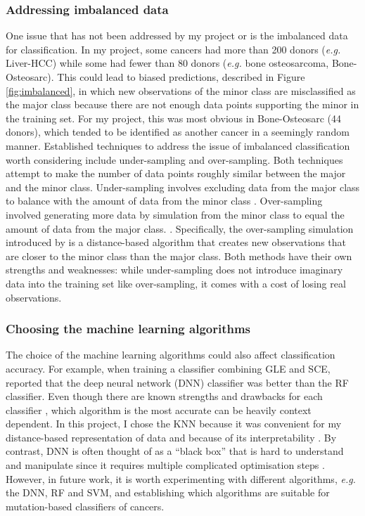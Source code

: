\subsubsection{Addressing imbalanced data}
One issue that has not been addressed by my project or \citet{Jiao2020} is the imbalanced data for classification. In my project, some cancers had more than 200 donors (\textit{e.g.} Liver-HCC) while some had fewer than 80 donors (\textit{e.g.} bone osteosarcoma, Bone-Osteosarc). This could lead to biased predictions, described in Figure \ref{fig:imbalanced}, in which new observations of the minor class are misclassified as the major class because there are not enough data points supporting the minor in the training set. For my project, this was most obvious in Bone-Osteosarc (44 donors), which tended to be identified as another cancer in a seemingly random manner. Established techniques to address the issue of imbalanced classification worth considering include under-sampling and over-sampling. Both techniques attempt to make the number of data points roughly similar between the major and the minor class. Under-sampling involves excluding data from the major class to balance with the amount of data from the minor class \citep{Kubat1997AddressingSelection}. Over-sampling involved generating more data by simulation from the minor class to equal the amount of data from the major class. \citep{Chawla2002SMOTE:Technique}. Specifically, the over-sampling simulation introduced by \citet{Chawla2002SMOTE:Technique} is a distance-based algorithm that creates new observations that are closer to the minor class than the major class. Both methods have their own strengths and weaknesses: while under-sampling does not introduce imaginary data into the training set like over-sampling, it comes with a cost of losing real observations.



\subsubsection{Choosing the machine learning algorithms}
The choice of the machine learning algorithms could also affect classification accuracy. For example, when training a classifier combining GLE and SCE, \citet{Jiao2020} reported that the deep neural network (DNN) classifier was better than the RF classifier. Even though there are known strengths and drawbacks for each classifier \citep{Susmita2019AAlgorithms}, which algorithm is the most accurate can be heavily context dependent. In this project, I chose the KNN because it was convenient for my distance-based representation of data and because of its interpretability \citep{Aly2005SurveyMethods}. By contrast, DNN is often thought of as a ``black box'' that is hard to understand and manipulate since it requires multiple complicated optimisation steps \citep{Shwartz-Ziv2017OpeningInformation}. However, in future work, it is worth experimenting with different algorithms, \textit{e.g.} the DNN, RF and SVM, and establishing which algorithms are suitable for mutation-based classifiers of cancers. 

